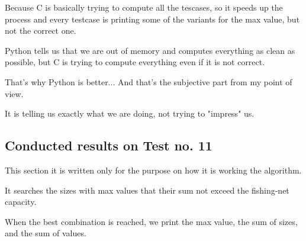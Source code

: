 \documentclass{article}%
\begin{document}
Because C is basically trying to compute all the tescases, so it speeds up the process and every testcase is printing some of the variants
for the max value, but not the correct one.                

Python tells us that we are out of memory and computes everything as clean as possible, but C is trying to compute everything even if it is not correct.

That's why Python is better... And that's the subjective part from my point of view. 

It is telling us exactly what we are doing, not trying to "impress" us.                   

 \vspace*{\fill}
%
\newpage%

\vspace*{\fill}
                        
\subsection{Conducted results on Test no. 11}

                        \vspace{1 cm}           
This section it is written only for the purpose on how it is working the algorithm.
                        
It searches the sizes with max values that their sum not exceed the fishing-net capacity.
                        
When the best combination is reached, we print the max value, the sum of sizes, and the sum of values.
                        
\end{document}
